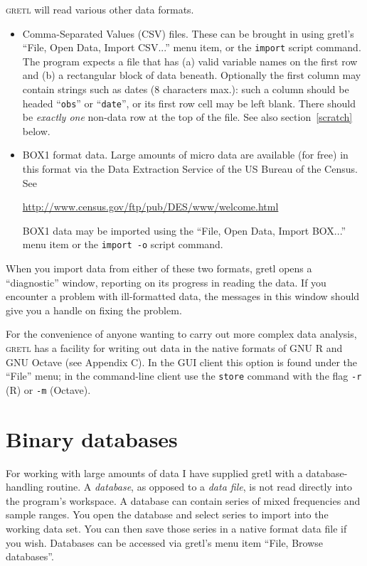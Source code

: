 \documentclass{article}
\begin{document}
\textsc{gretl} will read various other data formats.

\begin{itemize}
  
\item Comma-Separated Values (CSV) files.  These can be brought in
  using \textsf{gretl}'s ``File, Open Data, Import CSV...'' menu item,
  or the \texttt{import} script command.  The program expects a file
  that has (a) valid variable names on the first row and (b) a
  rectangular block of data beneath.  Optionally the first column may
  contain strings such as dates (8 characters max.): such a column
  should be headed ``\texttt{obs}'' or ``\texttt{date}'', or its first
  row cell may be left blank.  There should be \textit{exactly one}
  non-data row at the top of the file.  See also section~\ref{scratch}
  below.
  
\item BOX1 format data.  Large amounts of micro data are available
  (for free) in this format via the Data Extraction Service of the US
  Bureau of the Census.  See
 
  \url{http://www.census.gov/ftp/pub/DES/www/welcome.html}
  
  BOX1 data may be imported using the ``File, Open Data, Import
  BOX...'' menu item or the \texttt{import -o} script command.

\end{itemize}

When you import data from either of these two formats, \textsf{gretl}
opens a ``diagnostic'' window, reporting on its progress in reading
the data.  If you encounter a problem with ill-formatted data, the
messages in this window should give you a handle on fixing the
problem.

For the convenience of anyone wanting to carry out more complex data
analysis, \textsc{gretl} has a facility for writing out data in the
native formats of GNU R and GNU Octave (see Appendix C).  In the GUI
client this option is found under the ``File'' menu; in the
command-line client use the \texttt{store} command with the flag
\texttt{-r} (R) or \texttt{-m} (Octave).

\section{Binary databases}
\label{dbase}
  
For working with large amounts of data I have supplied \textsf{gretl}
with a database-handling routine.  A \textit{database}, as opposed to
a \textit{data file}, is not read directly into the program's
workspace.  A database can contain series of mixed frequencies and
sample ranges.  You open the database and select series to import
into the working data set.  You can then save those series in a native
format data file if you wish.  Databases can be accessed via
\textsf{gretl}'s menu item ``File, Browse databases''.
  
\end{document}
